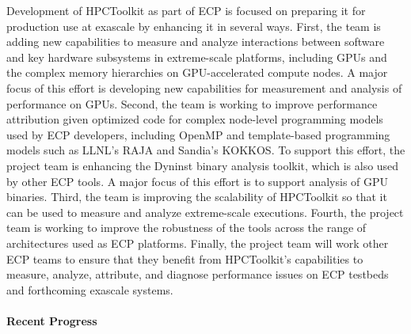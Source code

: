 Development of HPCToolkit as part of ECP is focused on preparing it
for production use at exascale by enhancing it in several ways. First,
the team is adding new capabilities to measure and analyze
interactions between software and key hardware subsystems in
extreme-scale platforms, including GPUs and the complex memory hierarchies on GPU-accelerated compute nodes. A major focus of this effort is developing new capabilities for 
measurement and analysis of performance on GPUs.
Second, the team is working to improve performance
attribution given optimized code for complex node-level programming
models used by ECP developers, including OpenMP and template-based
programming models such as LLNL's RAJA and Sandia's KOKKOS. To support
this effort, the project team is enhancing the Dyninst binary analysis
toolkit, which is also used by other ECP tools. A major focus of this effort 
is to support analysis of GPU binaries. Third, the team is
improving the scalability of HPCToolkit so that it can be used to
measure and analyze extreme-scale executions. Fourth, the project team
is working to improve the robustness of the tools across the range of
architectures used as ECP platforms. Finally, the project team will
work other ECP teams to ensure that they benefit from HPCToolkit's
capabilities to measure, analyze, attribute, and diagnose performance
issues on ECP testbeds and forthcoming exascale systems.

\newpage
\paragraph{Recent Progress}

